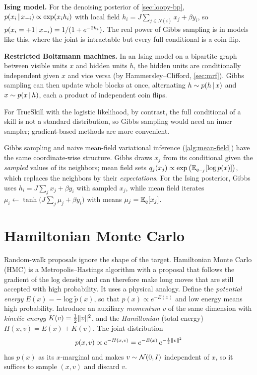 \smallskip\noindent\textbf{Ising model.} For the denoising posterior of \cref{sec:loopy-bp}, $p(x_i\,|\, x_{-i})\propto\exp(x_ih_i)$ with local field $h_i=J\sum_{j\in N(i)}x_j+\beta y_i$, so $p(x_i=+1\,|\, x_{-i})=1/(1+e^{-2h_i})$. The real power of Gibbs sampling is in models like this, where the joint is intractable but every full conditional is a coin flip.

\smallskip\noindent\textbf{Restricted Boltzmann machines.} In an Ising model on a bipartite graph between visible units $x$ and hidden units $h$, the hidden units are conditionally independent given $x$ and vice versa (by Hammersley--Clifford, \cref{sec:mrf}). Gibbs sampling can then update whole blocks at once, alternating $h\sim p(h\,|\, x)$ and $x\sim p(x\,|\, h)$, each a product of independent coin flips.

For TrueSkill with the logistic likelihood, by contrast, the full conditional of a skill is not a standard distribution, so Gibbs sampling would need an inner sampler; gradient-based methods are more convenient.

\begin{remark}
Gibbs sampling and naive mean-field variational inference (\cref{alg:mean-field}) have the same coordinate-wise structure. Gibbs draws $x_j$ from its conditional given the \emph{sampled} values of its neighbors; mean field sets $q_j(x_j)\propto\exp\big(\mathbb{E}_{q_{-j}}[\log p(x)]\big)$, which replaces the neighbors by their \emph{expectations}. For the Ising posterior, Gibbs uses $h_i=J\sum_{j}x_j+\beta y_i$ with sampled $x_j$, while mean field iterates $\mu_i\gets\tanh\big(J\sum_{j}\mu_j+\beta y_i\big)$ with means $\mu_j=\mathbb{E}_q[x_j]$.
\end{remark}

\section{Hamiltonian Monte Carlo}\label{sec:hmc}

Random-walk proposals ignore the shape of the target. Hamiltonian Monte Carlo (HMC) is a Metropolis--Hastings algorithm with a proposal that follows the gradient of the log density and can therefore make long moves that are still accepted with high probability. It uses a physical analogy. Define the \emph{potential energy} $E(x)=-\log\tilde p(x)$, so that $p(x)\propto e^{-E(x)}$ and low energy means high probability. Introduce an auxiliary \emph{momentum} $v$ of the same dimension with \emph{kinetic energy} $K(v)=\frac12\lVert v\rVert^2$, and the \emph{Hamiltonian} (total energy) $H(x,v)=E(x)+K(v)$. The joint distribution
\[
p(x,v)\propto e^{-H(x,v)}=e^{-E(x)}\,e^{-\frac12\lVert v\rVert^2}
\]
has $p(x)$ as its $x$-marginal and makes $v\sim\mathcal{N}(0,I)$ independent of $x$, so it suffices to sample $(x,v)$ and discard $v$.

